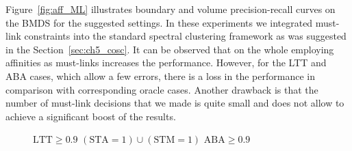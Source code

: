 Figure~\ref{fig:aff_ML} illustrates boundary and volume precision-recall curves on the BMDS for the suggested settings. In these experiments we integrated must-link constraints into the standard spectral clustering framework as 
was suggested in the Section~\ref{sec:ch5_cosc}. It can be observed that on the whole employing affinities as must-links increases the performance. However, for the LTT and ABA cases, which allow a few errors, 
there is a loss in the performance in comparison with corresponding oracle cases.
Another drawback is that the number of must-link decisions that we made is quite small and does not allow to achieve a significant boost of the results.    
\begin{figure}[htbp]
\begin{minipage}[t]{1\textwidth}
 \centering
\hfill \hfill \hfill
\footnotesize $\mathrm{LTT\geq 0.9}$
\hfill \hfill \hfill
\footnotesize $\mathrm{(STA=1)\cup(STM=1)}$
\hfill \hfill \hfill
\footnotesize $\mathrm{ABA\geq 0.9}$
\hfill  \hfill \hfill 
\end{minipage}
\begin{minipage}[t]{1\textwidth}
\centering
\hfill \hfill    
{} 
\hfill  
{} 
\hfill 
{} 
\hfill   \hfill


\end{minipage}
\end{figure}
